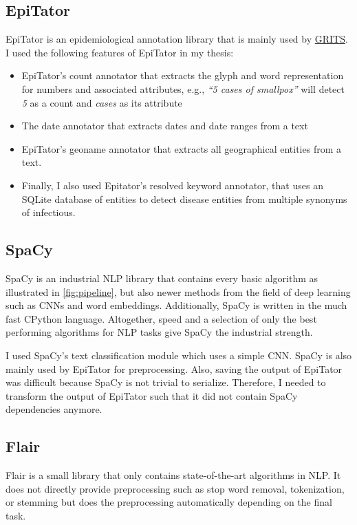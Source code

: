 \subsection{EpiTator}
  EpiTator is an epidemiological annotation library that is mainly used by \href{https://grits.eha.io}{GRITS}.
  I used the following features of EpiTator in my thesis:
  \begin{itemize}
    \item EpiTator's count annotator that extracts the glyph and word representation for numbers and associated attributes, e.g., \textit{``5 cases of smallpox''} will detect \textit{5} as a count and \textit{cases} as its attribute
    \item The date annotator that extracts dates and date ranges from a text
    \item EpiTator's geoname annotator that extracts all geographical entities from a text.
    \item Finally, I also used Epitator's resolved keyword annotator, that uses an SQLite database of entities to detect disease entities from multiple synonyms of infectious.
  \end{itemize}


\subsection{SpaCy}
  SpaCy is an industrial NLP library that contains every basic algorithm as illustrated in \ref{fig:pipeline}, but also newer methods from the field of deep learning such as CNNs and word embeddings.
  Additionally, SpaCy is written in the much fast CPython language.
  Altogether, speed and a selection of only the best performing algorithms for NLP tasks give SpaCy the industrial strength.

  I used SpaCy's text classification module which uses a simple CNN.
  SpaCy is also mainly used by EpiTator for preprocessing.
  Also, saving the output of EpiTator was difficult because SpaCy is not trivial to serialize.
  Therefore, I needed to transform the output of EpiTator such that it did not contain SpaCy dependencies anymore.

\subsection{Flair}
  Flair is a small library that only contains state-of-the-art algorithms in NLP.
  It does not directly provide preprocessing such as stop word removal, tokenization, or stemming but does the preprocessing automatically depending on the final task.

